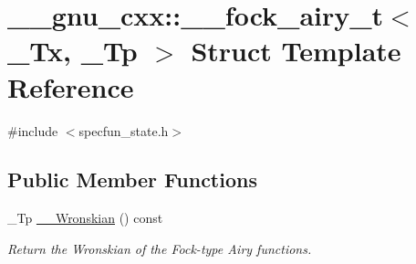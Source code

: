 \hypertarget{struct____gnu__cxx_1_1____fock__airy__t}{}\section{\+\_\+\+\_\+gnu\+\_\+cxx\+:\+:\+\_\+\+\_\+fock\+\_\+airy\+\_\+t$<$ \+\_\+\+Tx, \+\_\+\+Tp $>$ Struct Template Reference}
\label{struct____gnu__cxx_1_1____fock__airy__t}


{\ttfamily \#include $<$specfun\+\_\+state.\+h$>$}

\subsection*{Public Member Functions}
\begin{DoxyCompactItemize}
\item 
\+\_\+\+Tp \hyperlink{struct____gnu__cxx_1_1____fock__airy__t_af6d4b814bfe539b949982f62b912f9a5}{\+\_\+\+\_\+\+Wronskian} () const 
\begin{DoxyCompactList}\small\item\em Return the Wronskian of the Fock-\/type Airy functions. \end{DoxyCompactList}\end{DoxyCompactItemize}

